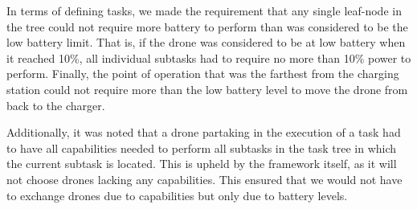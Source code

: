 In terms of defining tasks, we made the requirement that any single leaf-node in the tree could not require more battery to perform than was considered to be the low battery limit. That is, if the drone was considered to be at low battery when it reached 10\%, all individual subtasks had to require no more than 10\% power to perform. Finally, the point of operation that was the farthest from the charging station could not require more than the low battery level to move the drone from back to the charger.

Additionally, it was noted that a drone partaking in the execution of a task had to have all capabilities  needed to perform all subtasks in the task tree in which the current subtask is located. This is upheld by the framework itself, as it will not choose drones lacking any capabilities. This ensured that we would not have to exchange drones due to capabilities but only due to battery levels.